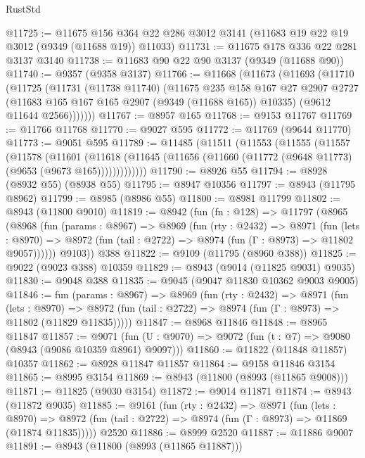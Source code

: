 \begin{lexlean}{RustStd}
\begin{coremodule}
{\begin{coremodule}
{{{{{{{{{{{{{{{{{{{{{{{{{{{{{{{{{{{{{{{@11725 := @11675
    @156
    @364
    @22
    @286
    @3012
    @3141
    (@11683 @19 @22 @19 @3012 (@9349 (@11688 @19)) @11033)
@11731 := @11675 @178 @336 @22 @281 @3137 @3140
@11738 := @11683 @90 @22 @90 @3137 (@9349 (@11688 @90))
@11740 := @9357 (@9358 @3137)
@11766 := @11668
    (@11673
      (@11693
        (@11710
          (@11725
            (@11731
              (@11738 @11740)
              (@11675
                @235
                @158
                @167
                @27
                @2907
                @2727
                (@11683 @165 @167 @165 @2907 (@9349 (@11688 @165)) @10335)
                (@9612 @11644 @2566)))))))
@11767 := @8957 @165
@11768 := @9153 @11767
@11769 := @11766 @11768
@11770 := @9027 @595
@11772 := @11769 (@9644 @11770)
@11773 := @9051 @595
@11789 := @11485
    (@11511
      (@11553
        (@11555
          (@11557
            (@11578
              (@11601
                (@11618
                  (@11645 (@11656 (@11660 (@11772 (@9648 @11773) (@9653 (@9673 @165)))))))))))))
@11790 := @8926 @55
@11794 := @8928 (@8932 @55) (@8938 @55)
@11795 := @8947 @10356
@11797 := @8943 (@11795 @8962)
@11799 := @8985 (@8986 @55)
@11800 := @8981 @11799
@11802 := @8943 (@11800 @9010)
@11819 := @8942
    (fun (fn : @128) =>
    @11797
      (@8965
        (@8968
          (fun (params : @8967) =>
          @8969
            (fun (rty : @2432) =>
            @8971
              (fun (lets : @8970) =>
              @8972 (fun (tail : @2722) => @8974 (fun (Γ : @8973) => @11802 @9057))))))
        @9103))
    @388
@11822 := @9109 (@11795 (@8960 @388))
@11825 := @9022 (@9023 @388) @10359
@11829 := @8943 (@9014 (@11825 @9031) @9035)
@11830 := @9048 @388
@11835 := @9045 (@9047 @11830 @10362 @9003 @9005)
@11846 := fun (params : @8967) =>
  @8969
    (fun (rty : @2432) =>
    @8971
      (fun (lets : @8970) =>
      @8972 (fun (tail : @2722) => @8974 (fun (Γ : @8973) => @11802 (@11829 @11835)))))
@11847 := @8968 @11846
@11848 := @8965 @11847
@11857 := @9071
    (fun (U : @9070) => @9072 (fun (t : @7) => @9080 (@8943 (@9086 @10359 @8961) @9097)))
@11860 := @11822 (@11848 @11857) @10357
@11862 := @8928 @11847 @11857
@11864 := @9158 @11846 @3154
@11865 := @8995 @3154
@11869 := @8943 (@11800 (@8993 (@11865 @9008)))
@11871 := @11825 (@9030 @3154)
@11872 := @9014 @11871
@11874 := @8943 (@11872 @9035)
@11885 := @9161
    (fun (rty : @2432) =>
    @8971
      (fun (lets : @8970) =>
      @8972 (fun (tail : @2722) => @8974 (fun (Γ : @8973) => @11869 (@11874 @11835)))))
    @2520
@11886 := @8999 @2520
@11887 := @11886 @9007
@11891 := @8943 (@11800 (@8993 (@11865 @11887)))
}}}}}}}}}}}}}}}}}}}}}}}}}}}}}}}}}}}}}}}
\end{coremodule}}
\end{coremodule}
\end{lexlean}
